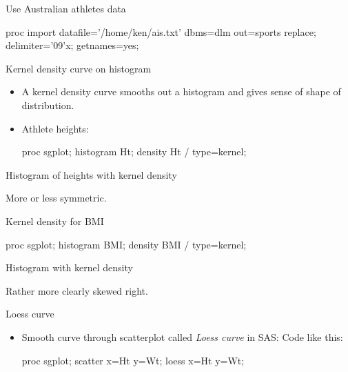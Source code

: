 \documentclass[unknownkeysallowed]{beamer}\usepackage[]{graphicx}\usepackage[]{color}
\begin{document}
\begin{frame}[fragile]{Use Australian athletes data}
  
    \begin{Datastep}
proc import 
  datafile='/home/ken/ais.txt'
  dbms=dlm
  out=sports
  replace;
  delimiter='09'x;
  getnames=yes;
    \end{Datastep}
  
  
\end{frame}


\begin{frame}[fragile]{Kernel density curve on histogram}

  \begin{itemize}
  \item A kernel density curve smooths out a histogram and gives sense
    of shape of distribution.
  \item Athlete heights:
\begin{Sascode}[store=mix]
proc sgplot;
  histogram Ht;
  density Ht / type=kernel;
\end{Sascode}

  \end{itemize}
  
\end{frame}

\begin{frame}[fragile]{Histogram of heights with kernel density}


More or less symmetric.
  
\end{frame}

\begin{frame}[fragile]{Kernel density for BMI}
  
\begin{Sascode}[store=miy]
proc sgplot;
  histogram BMI;
  density BMI / type=kernel;
\end{Sascode}
  
  
\end{frame}

\begin{frame}[fragile]{Histogram with kernel density}


Rather more clearly skewed right.  
  
\end{frame}


\begin{frame}[fragile]{Loess curve}

  \begin{itemize}
  \item Smooth curve through scatterplot called \emph{Loess curve}  in SAS: Code like this:
\begin{Sascode}[store=mjc]
proc sgplot;
  scatter x=Ht y=Wt;
  loess x=Ht y=Wt;
\end{Sascode}


  \end{itemize}
  
\end{frame}
\end{document}
